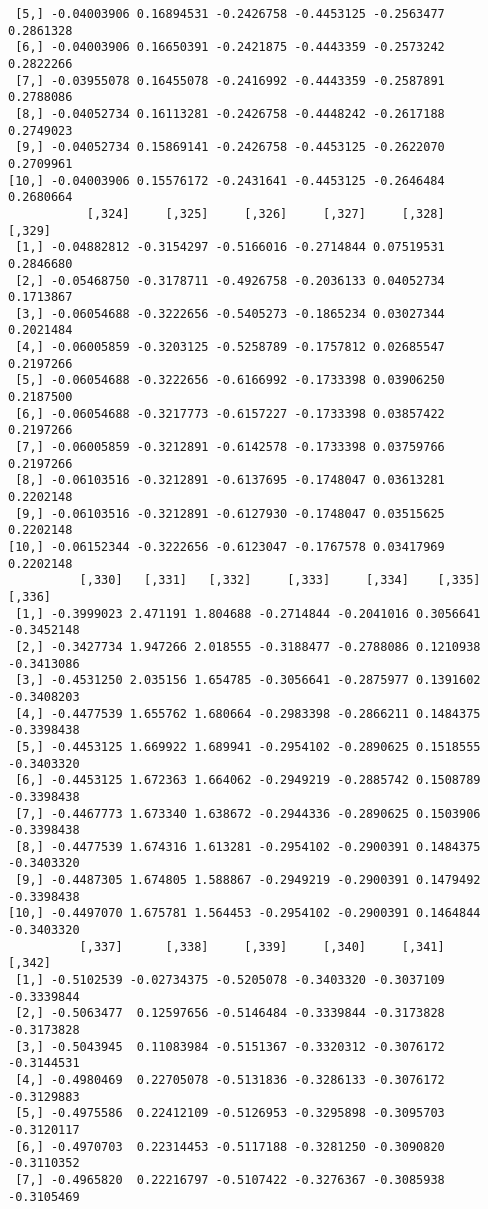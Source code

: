 \documentclass[
  letterpaper,
  DIV=11,
  numbers=noendperiod]{scrreprt}
\begin{document}
\begin{verbatim}
 [5,] -0.04003906 0.16894531 -0.2426758 -0.4453125 -0.2563477 0.2861328
 [6,] -0.04003906 0.16650391 -0.2421875 -0.4443359 -0.2573242 0.2822266
 [7,] -0.03955078 0.16455078 -0.2416992 -0.4443359 -0.2587891 0.2788086
 [8,] -0.04052734 0.16113281 -0.2426758 -0.4448242 -0.2617188 0.2749023
 [9,] -0.04052734 0.15869141 -0.2426758 -0.4453125 -0.2622070 0.2709961
[10,] -0.04003906 0.15576172 -0.2431641 -0.4453125 -0.2646484 0.2680664
           [,324]     [,325]     [,326]     [,327]     [,328]    [,329]
 [1,] -0.04882812 -0.3154297 -0.5166016 -0.2714844 0.07519531 0.2846680
 [2,] -0.05468750 -0.3178711 -0.4926758 -0.2036133 0.04052734 0.1713867
 [3,] -0.06054688 -0.3222656 -0.5405273 -0.1865234 0.03027344 0.2021484
 [4,] -0.06005859 -0.3203125 -0.5258789 -0.1757812 0.02685547 0.2197266
 [5,] -0.06054688 -0.3222656 -0.6166992 -0.1733398 0.03906250 0.2187500
 [6,] -0.06054688 -0.3217773 -0.6157227 -0.1733398 0.03857422 0.2197266
 [7,] -0.06005859 -0.3212891 -0.6142578 -0.1733398 0.03759766 0.2197266
 [8,] -0.06103516 -0.3212891 -0.6137695 -0.1748047 0.03613281 0.2202148
 [9,] -0.06103516 -0.3212891 -0.6127930 -0.1748047 0.03515625 0.2202148
[10,] -0.06152344 -0.3222656 -0.6123047 -0.1767578 0.03417969 0.2202148
          [,330]   [,331]   [,332]     [,333]     [,334]    [,335]     [,336]
 [1,] -0.3999023 2.471191 1.804688 -0.2714844 -0.2041016 0.3056641 -0.3452148
 [2,] -0.3427734 1.947266 2.018555 -0.3188477 -0.2788086 0.1210938 -0.3413086
 [3,] -0.4531250 2.035156 1.654785 -0.3056641 -0.2875977 0.1391602 -0.3408203
 [4,] -0.4477539 1.655762 1.680664 -0.2983398 -0.2866211 0.1484375 -0.3398438
 [5,] -0.4453125 1.669922 1.689941 -0.2954102 -0.2890625 0.1518555 -0.3403320
 [6,] -0.4453125 1.672363 1.664062 -0.2949219 -0.2885742 0.1508789 -0.3398438
 [7,] -0.4467773 1.673340 1.638672 -0.2944336 -0.2890625 0.1503906 -0.3398438
 [8,] -0.4477539 1.674316 1.613281 -0.2954102 -0.2900391 0.1484375 -0.3403320
 [9,] -0.4487305 1.674805 1.588867 -0.2949219 -0.2900391 0.1479492 -0.3398438
[10,] -0.4497070 1.675781 1.564453 -0.2954102 -0.2900391 0.1464844 -0.3403320
          [,337]      [,338]     [,339]     [,340]     [,341]     [,342]
 [1,] -0.5102539 -0.02734375 -0.5205078 -0.3403320 -0.3037109 -0.3339844
 [2,] -0.5063477  0.12597656 -0.5146484 -0.3339844 -0.3173828 -0.3173828
 [3,] -0.5043945  0.11083984 -0.5151367 -0.3320312 -0.3076172 -0.3144531
 [4,] -0.4980469  0.22705078 -0.5131836 -0.3286133 -0.3076172 -0.3129883
 [5,] -0.4975586  0.22412109 -0.5126953 -0.3295898 -0.3095703 -0.3120117
 [6,] -0.4970703  0.22314453 -0.5117188 -0.3281250 -0.3090820 -0.3110352
 [7,] -0.4965820  0.22216797 -0.5107422 -0.3276367 -0.3085938 -0.3105469

\end{verbatim}
\end{document}
